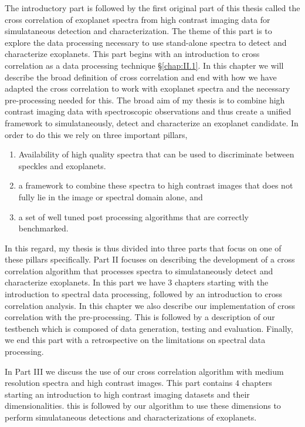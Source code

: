 The introductory part is followed by the first original part of this thesis called the cross correlation of exoplanet spectra from high contrast imaging data for simulataneous detection and characterization.
The theme of this part is to explore the data processing necessary to use stand-alone spectra to detect and characterize exoplanets.
This part begins with an introduction to cross correlation as a data processing technique \S \ref{chap:II.1}. 
In this chapter we will describe the broad definition of cross correlation and end with how we have adapted the cross correlation to  work with exoplanet spectra and the necessary pre-processing needed for this.
The broad aim of my thesis is to combine high contrast imaging data with spectroscopic observations and thus create a unified framework to simulataneously,
detect and characterize an exoplanet candidate.
In order to do this we rely on three important pillars,
\begin{enumerate}
    \item Availability of high quality spectra that can be used to discriminate between speckles and exoplanets.
    \item a framework to combine these spectra to high contrast images that does not fully lie in the image or spectral domain alone, and
    \item a set of well tuned post processing algorithms that are correctly benchmarked.
\end{enumerate}
In this regard, my thesis is thus divided into three parts that focus on one of these pillars specifically.
Part II focuses on describing the development of a cross correlation algorithm that processes spectra to simulataneously\@
detect and characterize exoplanets.
In this part we have $3$ chapters starting with the introduction to spectral data processing, followed by an introduction
to cross correlation analysis. 
In this chapter we also describe our implementation of cross correlation with the pre-processing.
This is followed by a description of our testbench which is composed of data generation, testing and evaluation.
Finally, we end this part with a retrospective on the limitations on spectral data processing. 

In Part III we discuss the use of our cross correlation algorithm with medium resolution spectra and high contrast images.
This part contains $4$ chapters starting an introduction to high contrast imaging datasets and their dimensionalities.
this is followed by our algorithm to use these dimensions to perform simulataneous detections and characterizations of exoplanets.

